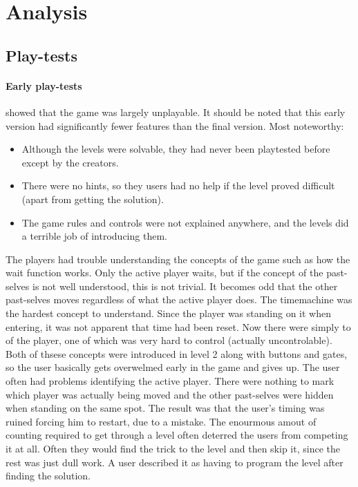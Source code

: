 \section{Analysis}
\subsection{Play-tests}
\paragraph{Early play-tests} showed that the game was largely unplayable. It should be noted that this early version had significantly fewer features than the final version. Most noteworthy:

\begin{itemize}
\item Although the levels were solvable, they had never been playtested before except by the creators.
\item There were no hints, so they users had no help if the level proved difficult (apart from getting the solution).
\item The game rules and controls were not explained anywhere, and the levels did a terrible job of introducing them.
\end{itemize}

The players had trouble understanding the concepts of the game such as how the wait function works. Only the active player waits, but if the concept of the past-selves is not well understood, this is not trivial. It becomes odd that the other past-selves moves regardless of what the active player does. The timemachine was the hardest concept to understand. Since the player was standing on it when entering, it was not apparent that time had been reset. Now there were simply to of the player, one of which was very hard to control (actually uncontrolable). Both of thsese concepts were introduced in level 2 along with buttons and gates, so the user basically gets overwelmed early in the game and gives up.
The user often had problems identifying the active player. There were nothing to mark which player was actually being moved and the other past-selves were hidden when standing on the same spot. The result was that the user's timing was ruined forcing him to restart, due to a mistake.
The enourmous amout of counting required to get through a level often deterred the users from competing it at all. Often they would find the trick to the level and then skip it, since the rest was just  dull work. A user described it as having to program the level after finding the solution.\\


